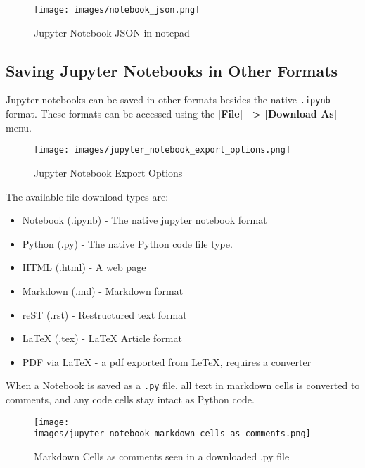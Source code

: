 \documentclass{book}
\makeatletter
\def\maxwidth{\ifdim\Gin@nat@width>\linewidth\linewidth
\else\Gin@nat@width\fi}
\let\Oldincludegraphics\includegraphics
\renewcommand{\includegraphics}[1]{\Oldincludegraphics[width=.8\maxwidth]{#1}}
\providecommand{\tightlist}{%
      \setlength{\itemsep}{0pt}\setlength{\parskip}{0pt}}
\newcommand{\passthrough}[1]{#1}
\makeatother
\begin{document}
\begin{figure}
\centering
\texttt{[image: images/notebook\_json.png]}
\caption{Jupyter Notebook JSON in notepad}
\end{figure}
    




    
        \hypertarget{saving-jupyter-notebooks-in-other-formats}{%
\subsection{Saving Jupyter Notebooks in Other
Formats}\label{saving-jupyter-notebooks-in-other-formats}}

Jupyter notebooks can be saved in other formats besides the native
\passthrough{\lstinline!.ipynb!} format. These formats can be accessed
using the \textbf{{[}File{]} --\textgreater{} {[}Download As{]}} menu.

\begin{figure}
\centering
\texttt{[image: images/jupyter\_notebook\_export\_options.png]}
\caption{Jupyter Notebook Export Options}
\end{figure}

The available file download types are:

\begin{itemize}
\tightlist
\item
  Notebook (.ipynb) - The native jupyter notebook format
\item
  Python (.py) - The native Python code file type.
\item
  HTML (.html) - A web page
\item
  Markdown (.md) - Markdown format
\item
  reST (.rst) - Restructured text format
\item
  LaTeX (.tex) - LaTeX Article format
\item
  PDF via LaTeX - a pdf exported from LeTeX, requires a converter
\end{itemize}

When a Notebook is saved as a \passthrough{\lstinline!.py!} file, all
text in markdown cells is converted to comments, and any code cells stay
intact as Python code.

\begin{figure}
\centering
\texttt{[image: images/jupyter\_notebook\_markdown\_cells\_as\_comments.png]}
\caption{Markdown Cells as comments seen in a downloaded .py file}
\end{figure}
    
\end{document}
